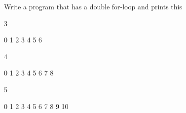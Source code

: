 Write a program that has a double for-loop and prints this

\begin{console}

3

  0 1 2 3 4 5 6

4

  0 1 2 3 4 5 6 7 8

5

  0 1 2 3 4 5 6 7 8 9 10

\end{console}

